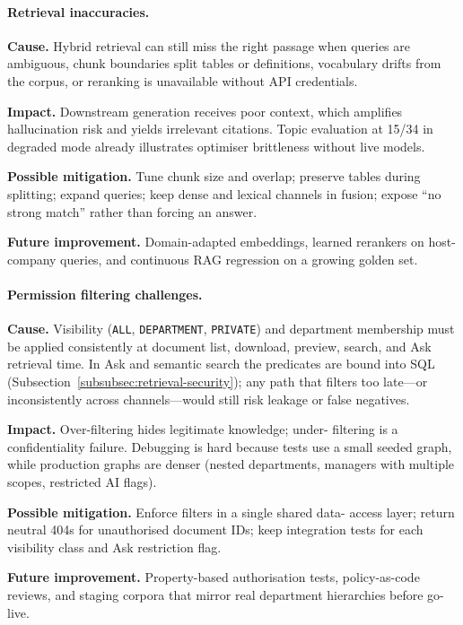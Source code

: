 \paragraph{Retrieval inaccuracies.}
\noindent\textbf{Cause.} Hybrid retrieval can still miss the right passage when
queries are ambiguous, chunk boundaries split tables or definitions, vocabulary
drifts from the corpus, or reranking is unavailable without API credentials.\par\vspace{0.15em}
\noindent\textbf{Impact.} Downstream generation receives poor context, which
amplifies hallucination risk and yields irrelevant citations. Topic evaluation at
15/34 in degraded mode already illustrates optimiser brittleness without live
models.\par\vspace{0.15em}
\noindent\textbf{Possible mitigation.} Tune chunk size and overlap; preserve
tables during splitting; expand queries; keep dense and lexical channels in
fusion; expose ``no strong match'' rather than forcing an answer.\par\vspace{0.15em}
\noindent\textbf{Future improvement.} Domain-adapted embeddings, learned
rerankers on host-company queries, and continuous RAG regression on a growing
golden set.
\par\vspace{0.35em}
\paragraph{Permission filtering challenges.}
\noindent\textbf{Cause.} Visibility (\texttt{ALL}, \texttt{DEPARTMENT},
\texttt{PRIVATE}) and department membership must be applied consistently at
document list, download, preview, search, and Ask retrieval time. In Ask and
semantic search the predicates are bound into SQL
(Subsection~\ref{subsubsec:retrieval-security}); any path that filters too
late---or inconsistently across channels---would still risk leakage or false
negatives.\par\vspace{0.15em}
\noindent\textbf{Impact.} Over-filtering hides legitimate knowledge; under-
filtering is a confidentiality failure. Debugging is hard because tests use a
small seeded graph, while production graphs are denser (nested departments,
managers with multiple scopes, restricted AI flags).\par\vspace{0.15em}
\noindent\textbf{Possible mitigation.} Enforce filters in a single shared data-
access layer; return neutral 404s for unauthorised document IDs; keep integration
tests for each visibility class and Ask restriction flag.\par\vspace{0.15em}
\noindent\textbf{Future improvement.} Property-based authorisation tests,
policy-as-code reviews, and staging corpora that mirror real department
hierarchies before go-live.
\par\vspace{0.35em}
